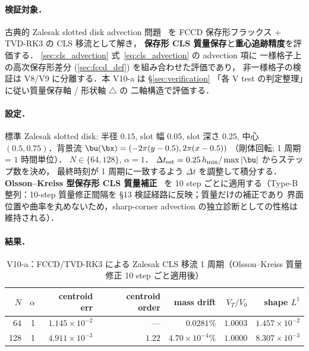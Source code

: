 \paragraph{検証対象．}
古典的 Zalesak slotted disk advection 問題~\cite{Zalesak1979} を
FCCD 保存形フラックス + TVD-RK3 の CLS 移流として解き，
\textbf{保存形 CLS 質量保存}と\textbf{重心追跡精度}を評価する．
\autoref{sec:cls_advection} 式~\eqref{eq:cls_advection} の advection 項に
一様格子上の高次保存形差分 (\autoref{sec:fccd_def}) を組み合わせた評価であり，
非一様格子の検証は V8/V9 に分離する．本 V10-a は §\ref{sec:verification}
「各 V test の判定整理」に従い質量保存軸 \checkmark / 形状軸 $\triangle$ の
二軸構造で評価する．

\paragraph{設定．}
標準 Zalesak slotted disk: 半径 $0.15$, slot 幅 $0.05$, slot 深さ $0.25$,
中心 $(0.5, 0.75)$．背景流 $\bu(\bx) = (-2\pi(y-0.5), 2\pi(x-0.5))$
（剛体回転; 1 周期 = $1$ 時間単位）．
$N \in \{64, 128\}$, $\alpha=1$．
$\Delta t_{\mathrm{est}} = 0.25\,h_{\min}/\max|\bu|$ からステップ数を決め，
最終時刻が 1 周期に一致するよう $\Delta t$ を調整して積分する．
\textbf{Olsson--Kreiss 型保存形 CLS 質量補正}~\cite{OlssonKreiss2005}
を 10 step ごとに適用する（Type-B 整列：10-step 質量修正間隔を
§13 検証経路に反映；質量だけの補正であり
界面位置や曲率を丸めないため，sharp-corner advection の独立診断としての性格は維持される）．

\paragraph{結果．}
\begin{table}[!htbp]
\caption{V10-a：FCCD/TVD-RK3 による Zalesak CLS 移流 1 周期（Olsson--Kreiss 質量修正 10 step ごと適用後）}
\label{tab:V10_zalesak}
\centering\small
\begin{tabular}{r r r r r r r}
\toprule
$N$ & $\alpha$ & centroid err & centroid order & mass drift & $V_T/V_0$ & shape $L^1$ \\
\midrule
64  & 1 & $1.145\times 10^{-2}$ & ---    & $0.0281\%$    & $1.0003$ & $1.457\times 10^{-2}$ \\
128 & 1 & $4.911\times 10^{-3}$ & $1.22$ & $4.70\times 10^{-4}\%$ & $1.0000$ & $8.307\times 10^{-3}$ \\
\bottomrule
\end{tabular}
\end{table}

